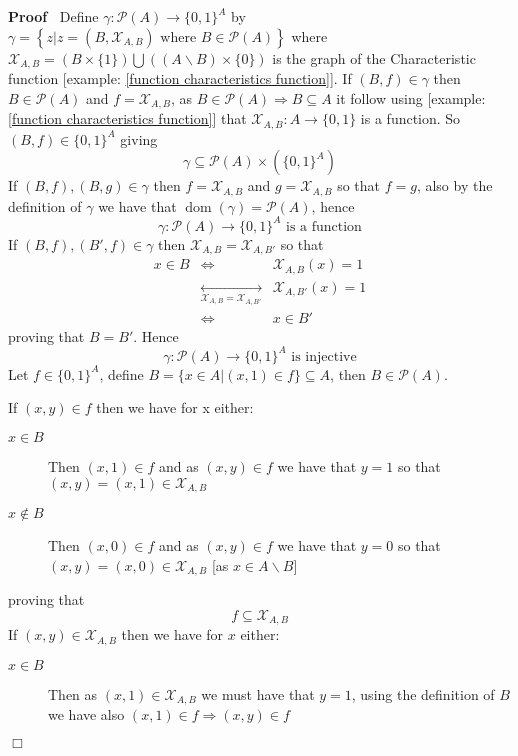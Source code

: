 \documentclass{book}
\newcommand{\Leftrightarrowlim}{\mathop{\leftrightarrow}\limits}
\newcommand{\nin}{\not\in}
\newcommand{\tmop}[1]{\ensuremath{\operatorname{#1}}}
\newenvironment{proof}{\noindent\textbf{Proof\ }}{\hspace*{\fill}$\Box$\medskip}
\begin{document}
\begin{proof}
  Define $\gamma : \mathcal{P} (A) \rightarrow \{ 0, 1 \}^A$ by $\gamma =
  \left\{ z|z = (B, \mathcal{X}_{A, B}) \text{ where } B \in \mathcal{P} (A)
  \right\}$ where $\mathcal{X}_{A, B} = (B \times \{ 1 \}) \bigcup
  ((A\backslash B) \times \{ 0 \})$ is the graph of the Characteristic
  function [example: \ref{function characteristics function}]. If $(B, f) \in
  \gamma$ then \ $B \in \mathcal{P} (A)$ and $f =\mathcal{X}_{A, B}$, as $B
  \in \mathcal{P} (A) \Rightarrow B \subseteq A$ it follow using [example:
  \ref{function characteristics function}] that $\mathcal{X}_{A, B} : A
  \rightarrow \{ 0, 1 \}$ is a function. So $(B, f) \in \{ 0, 1 \}^A$ giving
  \[ \gamma \subseteq \mathcal{P} (A) \times (\{ 0, 1 \}^A) \]
  If $(B, f), (B, g) \in \gamma$ then $f =\mathcal{X}_{A, B}$ and $g
  =\mathcal{X}_{A, B}$ so that $f = g$, also by the definition of $\gamma$ we
  have that $\tmop{dom} (\gamma) =\mathcal{P} (A)$, hence
  \[ \gamma : \mathcal{P} (A) \rightarrow \{ 0, 1 \}^A \text{ is a function}
  \]
  If $(B, f), (B', f) \in \gamma$ then $\mathcal{X}_{A, B} =\mathcal{X}_{A,
  B'}$ so that
  \begin{eqnarray*}
    x \in B & \Leftrightarrow & \mathcal{X}_{A, B} (x) = 1\\
    & \Leftrightarrowlim_{\mathcal{X}_{A, B} =\mathcal{X}_{A, B'}} &
    \mathcal{X}_{A, B'} (x) = 1\\
    & \Leftrightarrow & x \in B'
  \end{eqnarray*}
  proving that $B = B'$. Hence
  \[ \gamma : \mathcal{P} (A) \rightarrow \{ 0, 1 \}^A \text{ is injective}
  \]
  Let $f \in \{ 0, 1 \}^A$, define $B = \{ x \in A| (x, 1) \in f \} \subseteq
  A$, then $B \in \mathcal{P} (A)$.
  
  If $(x, y) \in f$ then we have for x either:
  \begin{description}
    \item[$x \in B$] Then $(x, 1) \in f$ and as $(x, y) \in f$ we have that $y
    = 1$ so that $(x, y) = (x, 1) \in \mathcal{X}_{A, B}$
    
    \item[$x \nin B$] Then $(x, 0) \in f$ and as $(x, y) \in f$ we have that
    $y = 0$ so that $(x, y) = (x, 0) \in \mathcal{X}_{A, B}$ [as $x \in
    A\backslash B$]
  \end{description}
  proving that
  \begin{equation}
    \label{eq 2.17.006} f \subseteq \mathcal{X}_{A, B}
  \end{equation}
  If $(x, y) \in \mathcal{X}_{A, B}$ then we have for $x$ either:
  \begin{description}
    \item[$x \in B$] Then as $(x, 1) \in \mathcal{X}_{A, B}$ we must have that
    $y = 1$, using the definition of $B$ we have also $(x, 1) \in f
    \Rightarrow (x, y) \in f$
    

\end{description}
\end{proof}
\end{document}
